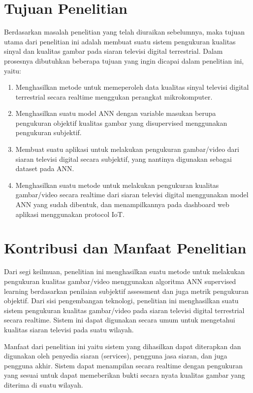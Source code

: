 \section{Tujuan Penelitian}
\label{sec:4-TujuanPenelitian}
\hspace{1,2cm}Berdasarkan masalah penelitian yang telah diuraikan sebelumnya, maka tujuan utama dari penelitian ini adalah membuat suatu sistem pengukuran kualitas sinyal dan kualitas gambar pada siaran televisi digital terrestrial. Dalam prosesnya dibutuhkan beberapa tujuan yang ingin dicapai dalam penelitian ini, yaitu:
\begin{enumerate}
	\item Menghasilkan metode untuk memeperoleh data kualitas sinyal televisi digital terrestrial secara realtime menggukan perangkat mikrokomputer.
	\item Menghasilkan suatu model ANN dengan variable masukan berupa pengukuran objektif kualitas gambar yang disupervised menggunakan pengukuran subjektif.
	\item Membuat suatu aplikasi untuk melakukan pengukuran gambar/video dari siaran televisi digital secara subjektif, yang nantinya digunakan sebagai dataset pada ANN. 
	\item Menghasilkan suatu metode untuk melakukan pengukuran kualitas gambar/video secara realtime dari siaran televisi digital menggunakan model ANN yang sudah dibentuk, dan menampilkannya pada dashboard web aplikasi menggunakan protocol IoT. 
\end{enumerate}

\section{Kontribusi dan Manfaat Penelitian}
\label{sec:5-KontribusidanManfaatPenelitian}
\hspace{1,2cm}Dari segi keilmuan, penelitian ini menghasilkan suatu metode untuk melakukan pengukuran kualitas gambar/video menggunakan algoritma ANN supervised learning berdasarkan penilaian subjektif assessment dan juga metrik pengukuran objektif. Dari sisi pengembangan teknologi, penelitian ini menghasilkan suatu sistem pengukuran kualitas gambar/video pada siaran televisi digital terrestrial secara realtime. Sistem ini dapat digunakan secara umum untuk mengetahui kualitas siaran televisi pada suatu wilayah.

Manfaat dari penelitian ini yaitu sistem yang dihasilkan dapat diterapkan dan digunakan oleh penyedia siaran (services), pengguna jasa siaran, dan juga pengguna akhir. Sistem dapat menampilan secara realtime dengan pengukuran yang sesuai untuk dapat memeberikan bukti secara nyata kualitas gambar yang diterima di suatu wilayah.

